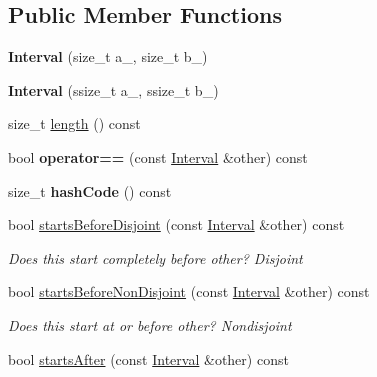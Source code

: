 \subsection*{Public Member Functions}
\begin{DoxyCompactItemize}
\item 
\mbox{\label{classantlr4_1_1misc_1_1Interval_a0ca71c00d96c953a5a51f5853fdd6e2c}} 
{\bfseries Interval} (size\+\_\+t a\+\_\+, size\+\_\+t b\+\_\+)
\item 
\mbox{\label{classantlr4_1_1misc_1_1Interval_a6883f4f86cdadb14f8c6996a13f0a680}} 
{\bfseries Interval} (ssize\+\_\+t a\+\_\+, ssize\+\_\+t b\+\_\+)
\item 
size\+\_\+t \hyperlink{classantlr4_1_1misc_1_1Interval_a05e2505cce0c79858b76ad20914c7674}{length} () const
\item 
\mbox{\label{classantlr4_1_1misc_1_1Interval_abc0ddd748c8e5f1f09db46d965f399b0}} 
bool {\bfseries operator==} (const \hyperlink{classantlr4_1_1misc_1_1Interval}{Interval} \&other) const
\item 
\mbox{\label{classantlr4_1_1misc_1_1Interval_aff13999967b0c0c56c9cda5640fc5d32}} 
size\+\_\+t {\bfseries hash\+Code} () const
\item 
bool \hyperlink{classantlr4_1_1misc_1_1Interval_a74cbb460b47b3f30a9b1c974ff96698e}{starts\+Before\+Disjoint} (const \hyperlink{classantlr4_1_1misc_1_1Interval}{Interval} \&other) const
\begin{DoxyCompactList}\small\item\em Does this start completely before other? Disjoint \end{DoxyCompactList}\item 
bool \hyperlink{classantlr4_1_1misc_1_1Interval_a2d716ddeb5c7691092d855e7db3d1a73}{starts\+Before\+Non\+Disjoint} (const \hyperlink{classantlr4_1_1misc_1_1Interval}{Interval} \&other) const
\begin{DoxyCompactList}\small\item\em Does this start at or before other? Nondisjoint \end{DoxyCompactList}\item 
bool \hyperlink{classantlr4_1_1misc_1_1Interval_ab42e396d0e2f9ead8ea9125a069a2d88}{starts\+After} (const \hyperlink{classantlr4_1_1misc_1_1Interval}{Interval} \&other) const

\end{DoxyCompactItemize}
